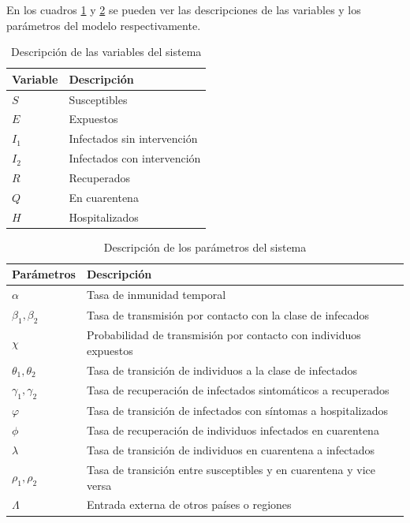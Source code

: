 \documentclass[conference]{IEEEtran}
\begin{document}
En los cuadros \ref{var_desc} y \ref{sys_pars} se pueden ver las descripciones de las
variables y los parámetros del modelo respectivamente.

\begin{table}[h]
    \centering
    \begin{tabular}{ll}
    \hline
    Variable & Descripción                 \\ \hline
    $S$      & Susceptibles                \\ 
    $E$      & Expuestos                   \\ 
    $I_1$    & Infectados sin intervención \\ 
    $I_2$    & Infectados con intervención \\ 
    $R$      & Recuperados                 \\ 
    $Q$      & En cuarentena               \\ 
    $H$      & Hospitalizados              \\ \hline
    \end{tabular}
    \caption{Descripción de las variables del sistema}
    \label{var_desc}
\end{table}


\begin{table}[h]
    \begin{tabular}{ll}
    \hline
    Parámetros            & Descripción                                                        \\ \hline
    $\alpha$              & Tasa de inmunidad temporal                                         \\ 
    $\beta_1, \beta_2$    & Tasa de transmisión por contacto con la clase de infecados         \\ 
    $\chi$                & Probabilidad de transmisión por contacto con individuos expuestos  \\ 
    $\theta_1 , \theta_2$ & Tasa de transición de individuos a la clase de infectados          \\ 
    $\gamma_1 , \gamma_2$ & Tasa de recuperación de infectados sintomáticos a recuperados      \\ 
    $\varphi$                & Tasa de transición de infectados con síntomas a hospitalizados     \\ 
    $\phi$                & Tasa de recuperación de individuos infectados en cuarentena        \\ 
    $\lambda$             & Tasa de transición de individuos en cuarentena a infectados        \\ 
    $\rho_1 , \rho_2$     & Tasa de transición entre susceptibles y en cuarentena y vice versa \\ 
    $\Lambda$             & Entrada externa de otros países o regiones                         \\ \hline
    \end{tabular}
    \caption{Descripción de los parámetros del sistema}
    \label{sys_pars}
\end{table}
\end{document}
